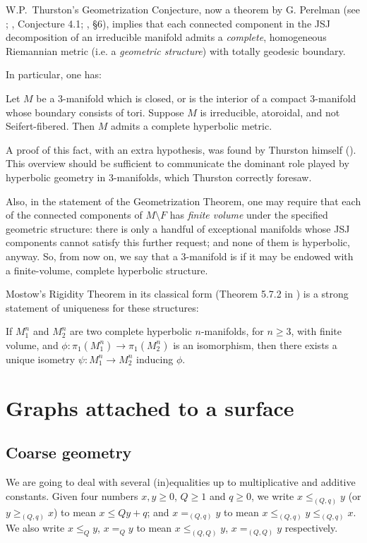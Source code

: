 W.P.~Thurston's Geometrization Conjecture, now a theorem by G. Perelman (see \cite{cao2006complete}; \cite{bonahon2002geometric}, Conjecture 4.1; \cite{friedl}, \S 6), implies that each connected component in the JSJ decomposition of an irreducible manifold admits a \emph{complete}, homogeneous Riemannian metric (i.e. a \emph{geometric structure}) with totally geodesic boundary.

In particular, one has:
\begin{claim}
Let $M$ be a 3-manifold which is closed, or is the interior of a compact 3-manifold whose boundary consists of tori. Suppose $M$ is irreducible, atoroidal, and not Seifert-fibered. Then $M$ admits a complete hyperbolic metric.
\end{claim}

A proof of this fact, with an extra hypothesis, was found by Thurston himself (\cite{thurstonhaken}). This overview should be sufficient to communicate the dominant role played by hyperbolic geometry in 3-manifolds, which Thurston correctly foresaw.

Also, in the statement of the Geometrization Theorem, one may require that each of the connected components of $M\setminus F$ has \emph{finite volume} under the specified geometric structure: there is only a handful of exceptional manifolds whose JSJ components cannot satisfy this further request; and none of them is hyperbolic, anyway. So, from now on, we say that a 3-manifold is  if it may be endowed with a finite-volume, complete hyperbolic structure.

Mostow's Rigidity Theorem in its classical form (Theorem 5.7.2 in \cite{thurstonnotes}) is a strong statement of uniqueness for these structures:
\begin{claim}
If $M_1^n$ and $M_2^n$ are two complete hyperbolic $n$-manifolds, for $n\geq 3$, with finite volume, and $\phi:\pi_1(M_1^n)\rightarrow \pi_1(M_2^n)$ is an isomorphism, then there exists a unique isometry $\psi: M_1^n\rightarrow M_2^n$ inducing $\phi$.
\end{claim}

\section{Graphs attached to a surface}\label{sec:graphs}
\subsection{Coarse geometry}
We are going to deal with several (in)equalities up to multiplicative and additive constants. Given four numbers $x,y\geq 0$, $Q\geq 1$ and $q\geq 0$, we write $x\leq_{(Q,q)} y$ (or $y\geq_{(Q,q)} x$) to mean $x\leq Qy+q$; and $x=_{(Q,q)} y$ to mean $x\leq_{(Q,q)} y \leq_{(Q,q)} x$. We also write $x\leq_Q y$, $x=_Q y$ to mean $x\leq_{(Q,Q)} y$, $x=_{(Q,Q)} y$ respectively.

